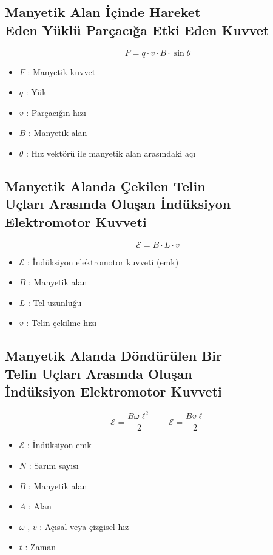 \documentclass[a4paper, 11pt, titlepage]{article}
\begin{document}
\subsection[Hareket Eden Yüklü Parçacığa Etki Eden Manyetik Kuvvet]{Manyetik Alan İçinde Hareket \\Eden Yüklü Parçacığa Etki Eden Kuvvet}
\[
F = q \cdot v \cdot B \cdot \sin \theta
\]
\begin{itemize}
  \item $F$ : Manyetik kuvvet
  \item $q$ : Yük
  \item $v$ : Parçacığın hızı
  \item $B$ : Manyetik alan
  \item $\theta$ : Hız vektörü ile manyetik alan arasındaki açı
\end{itemize}

\subsection[Çekilen Telde İndüksiyon EMK]{Manyetik Alanda Çekilen Telin \\Uçları Arasında Oluşan İndüksiyon \\Elektromotor Kuvveti}
\[
\mathcal{E} = B \cdot L \cdot v
\]
\begin{itemize}
  \item $\mathcal{E}$ : İndüksiyon elektromotor kuvveti (emk)
  \item $B$ : Manyetik alan
  \item $L$ : Tel uzunluğu
  \item $v$ : Telin çekilme hızı
\end{itemize}

\subsection[Döndürülen Telde İndüksiyon EMK]{Manyetik Alanda Döndürülen Bir \\Telin Uçları Arasında Oluşan \\İndüksiyon Elektromotor Kuvveti}
\[
\mathcal{E} = \frac{B\omega\ell^2}{2} \qquad \mathcal{E} = \frac{Bv\ell}{2}
\]
\begin{itemize}
  \item $\mathcal{E}$ : İndüksiyon emk
  \item $N$ : Sarım sayısı
  \item $B$ : Manyetik alan
  \item $A$ : Alan
  \item $\omega$ , $v$ : Açısal veya çizgisel hız
  \item $t$ : Zaman
\end{itemize}
\end{document}
